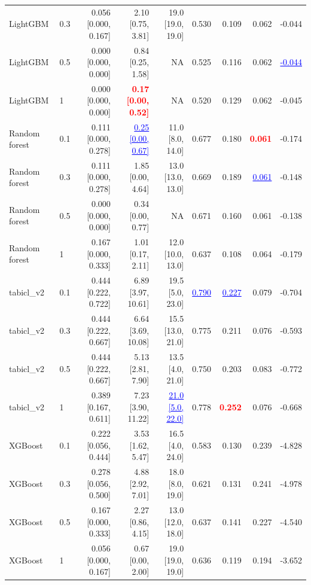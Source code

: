 \begin{table}[!htbp]
{\begin{tabular}{llrrrrrrr}
LightGBM & 0.3 & 0.056 [0.000, 0.167] & 2.10 [0.75, 3.81] & 19.0 [19.0, 19.0] & 0.530 & 0.109 & 0.062 & -0.044 \\
LightGBM & 0.5 & 0.000 [0.000, 0.000] & 0.84 [0.25, 1.58] & NA & 0.525 & 0.116 & 0.062 & \textcolor{blue}{\underline{-0.044}} \\
LightGBM & 1 & 0.000 [0.000, 0.000] & \textcolor{red}{\textbf{0.17 [0.00, 0.52]}} & NA & 0.520 & 0.129 & 0.062 & -0.045 \\
Random forest & 0.1 & 0.111 [0.000, 0.278] & \textcolor{blue}{\underline{0.25 [0.00, 0.67]}} & 11.0 [8.0, 14.0] & 0.677 & 0.180 & \textcolor{red}{\textbf{0.061}} & -0.174 \\
Random forest & 0.3 & 0.111 [0.000, 0.278] & 1.85 [0.00, 4.64] & 13.0 [13.0, 13.0] & 0.669 & 0.189 & \textcolor{blue}{\underline{0.061}} & -0.148 \\
Random forest & 0.5 & 0.000 [0.000, 0.000] & 0.34 [0.00, 0.77] & NA & 0.671 & 0.160 & 0.061 & -0.138 \\
Random forest & 1 & 0.167 [0.000, 0.333] & 1.01 [0.17, 2.11] & 12.0 [10.0, 13.0] & 0.637 & 0.108 & 0.064 & -0.179 \\
tabicl\_v2 & 0.1 & 0.444 [0.222, 0.722] & 6.89 [3.97, 10.61] & 19.5 [5.0, 23.0] & \textcolor{blue}{\underline{0.790}} & \textcolor{blue}{\underline{0.227}} & 0.079 & -0.704 \\
tabicl\_v2 & 0.3 & 0.444 [0.222, 0.667] & 6.64 [3.69, 10.08] & 15.5 [13.0, 21.0] & 0.775 & 0.211 & 0.076 & -0.593 \\
tabicl\_v2 & 0.5 & 0.444 [0.222, 0.667] & 5.13 [2.81, 7.90] & 13.5 [4.0, 21.0] & 0.750 & 0.203 & 0.083 & -0.772 \\
tabicl\_v2 & 1 & 0.389 [0.167, 0.611] & 7.23 [3.90, 11.22] & \textcolor{blue}{\underline{21.0 [5.0, 22.0]}} & 0.778 & \textcolor{red}{\textbf{0.252}} & 0.076 & -0.668 \\
XGBoost & 0.1 & 0.222 [0.056, 0.444] & 3.53 [1.62, 5.47] & 16.5 [4.0, 24.0] & 0.583 & 0.130 & 0.239 & -4.828 \\
XGBoost & 0.3 & 0.278 [0.056, 0.500] & 4.88 [2.92, 7.01] & 18.0 [8.0, 19.0] & 0.621 & 0.131 & 0.241 & -4.978 \\
XGBoost & 0.5 & 0.167 [0.000, 0.333] & 2.27 [0.86, 4.15] & 13.0 [12.0, 18.0] & 0.637 & 0.141 & 0.227 & -4.540 \\
XGBoost & 1 & 0.056 [0.000, 0.167] & 0.67 [0.00, 2.00] & 19.0 [19.0, 19.0] & 0.636 & 0.119 & 0.194 & -3.652 \\
\bottomrule
\end{tabular}
}
\end{table}
